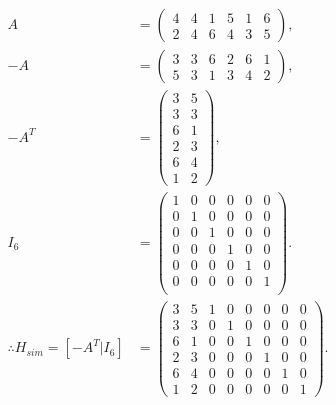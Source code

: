 \begin{align*}
	A &= 
\begin{pmatrix}
4	&	4	&	1	&	5	&	1	&	6	\\
2	&	4	&	6	&	4	&	3	&	5	
\end{pmatrix},\\
-A &= 
\begin{pmatrix}
3	&	3	&	6	&	2	&	6	&	1	\\
5	&	3	&	1	&	3	&	4	&	2
\end{pmatrix},\\
-A^{T} &= 
\begin{pmatrix}
3 & 5 \\
3 & 3 \\
6 & 1\\
2 & 3 \\
6 & 4 \\
1 & 2
\end{pmatrix},\\
I_{6} &=
\begin{pmatrix}
1	&	0	&	0	&	0	&	0	&	0 \\
0	&	1	&	0	&	0	&	0	&	0 \\
0	&	0	&	1	&	0	&	0	&	0 \\
0	&	0	&	0	&	1	&	0	&	0 \\
0	&	0	&	0	&	0	&	1	&	0 \\
0	&	0	&	0	&	0	&	0	&	1 \\
\end{pmatrix}.\\
	\therefore H_{sim} = \left[-A^{T}|I_{6} \right] &=
\begin{pmatrix}
3	&	5	&	1	&	0	&	0	&	0	&	0	&	0	\\
3	&	3	&	0	&	1	&	0	&	0	&	0	&	0	\\
6	&	1	&	0	&	0	&	1	&	0	&	0	&	0	\\
2	&	3	&	0	&	0	&	0	&	1	&	0	&	0	\\
6	&	4	&	0	&	0	&	0	&	0	&	1	&	0	\\
1	&	2	&	0	&	0	&	0	&	0	&	0	&	1	
\end{pmatrix}. 
\end{align*}




